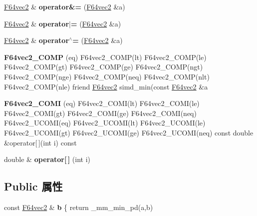 \begin{DoxyCompactItemize}
\hyperlink{class_f64vec2}{F64vec2} \& {\bfseries operator\&=} (\hyperlink{class_f64vec2}{F64vec2} \&a)
\item 
\mbox{\label{class_f64vec2_a151caff1c403e0485bf0711f0b32f6a4}} 
\hyperlink{class_f64vec2}{F64vec2} \& {\bfseries operator$\vert$=} (\hyperlink{class_f64vec2}{F64vec2} \&a)
\item 
\mbox{\label{class_f64vec2_a63e0f86316b30d189ebe83c1b1b02689}} 
\hyperlink{class_f64vec2}{F64vec2} \& {\bfseries operator$^\wedge$=} (\hyperlink{class_f64vec2}{F64vec2} \&a)
\item 
\mbox{\label{class_f64vec2_a7b427ea2cd1419d71e10d68d90d4bdba}} 
{\bfseries F64vec2\+\_\+\+C\+O\+MP} (eq) F64vec2\+\_\+\+C\+O\+MP(lt) F64vec2\+\_\+\+C\+O\+MP(le) F64vec2\+\_\+\+C\+O\+MP(gt) F64vec2\+\_\+\+C\+O\+MP(ge) F64vec2\+\_\+\+C\+O\+MP(ngt) F64vec2\+\_\+\+C\+O\+MP(nge) F64vec2\+\_\+\+C\+O\+MP(neq) F64vec2\+\_\+\+C\+O\+MP(nlt) F64vec2\+\_\+\+C\+O\+MP(nle) friend \hyperlink{class_f64vec2}{F64vec2} simd\+\_\+min(const \hyperlink{class_f64vec2}{F64vec2} \&a
\item 
\mbox{\label{class_f64vec2_a16a367de1ee625b2dc2ef2fd086b1db7}} 
{\bfseries F64vec2\+\_\+\+C\+O\+MI} (eq) F64vec2\+\_\+\+C\+O\+MI(lt) F64vec2\+\_\+\+C\+O\+MI(le) F64vec2\+\_\+\+C\+O\+MI(gt) F64vec2\+\_\+\+C\+O\+MI(ge) F64vec2\+\_\+\+C\+O\+MI(neq) F64vec2\+\_\+\+U\+C\+O\+MI(eq) F64vec2\+\_\+\+U\+C\+O\+MI(lt) F64vec2\+\_\+\+U\+C\+O\+MI(le) F64vec2\+\_\+\+U\+C\+O\+MI(gt) F64vec2\+\_\+\+U\+C\+O\+MI(ge) F64vec2\+\_\+\+U\+C\+O\+MI(neq) const double \&operator\mbox{[}$\,$\mbox{]}(int i) const
\item 
\mbox{\label{class_f64vec2_a7ea837169e3c6cdf28406ecd86510864}} 
double \& {\bfseries operator\mbox{[}$\,$\mbox{]}} (int i)
\end{DoxyCompactItemize}
\subsection*{Public 属性}
\begin{DoxyCompactItemize}
\item 
\mbox{\label{class_f64vec2_ad9201ef06a192d511a00ca57b52f8b2d}} 
const \hyperlink{class_f64vec2}{F64vec2} \& {\bfseries b} \{ return \+\_\+mm\+\_\+min\+\_\+pd(a,b)
\end{DoxyCompactItemize}
